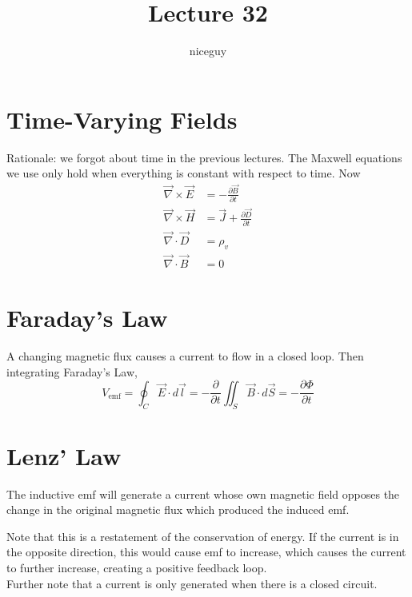 \documentclass[12pt]{article}
\author{niceguy}
\title{Lecture 32}
\begin{document}
\maketitle

\section{Time-Varying Fields}

Rationale: we forgot about time in the previous lectures. The Maxwell equations we use only hold when everything is constant with respect to time. Now
\begin{align*}
    \vec\nabla \times \vec E &= -\frac{\partial\vec B}{\partial t} \\
    \vec\nabla \times \vec H &= \vec J + \frac{\partial\vec D}{\partial t} \\
    \vec\nabla \cdot \vec D &= \rho_v \\
    \vec\nabla \cdot \vec B &= 0
\end{align*}

\section{Faraday's Law}

A changing magnetic flux causes a current to flow in a closed loop. Then integrating Faraday's Law,
$$V_{\text{emf}} = \oint_C \vec E \cdot d\vec l = -\frac{\partial}{\partial t} \iint_S \vec B \cdot d\vec S = -\frac{\partial\Phi}{\partial t}$$

\section{Lenz' Law}

\begin{defn}
    The inductive emf will generate a current whose own magnetic field opposes the change in the original magnetic flux which produced the induced emf.
\end{defn}

Note that this is a restatement of the conservation of energy. If the current is in the opposite direction, this would cause emf to increase, which causes the current to further increase, creating a positive feedback loop. \\
Further note that a current is only generated when there is a closed circuit. \\
\end{document}
